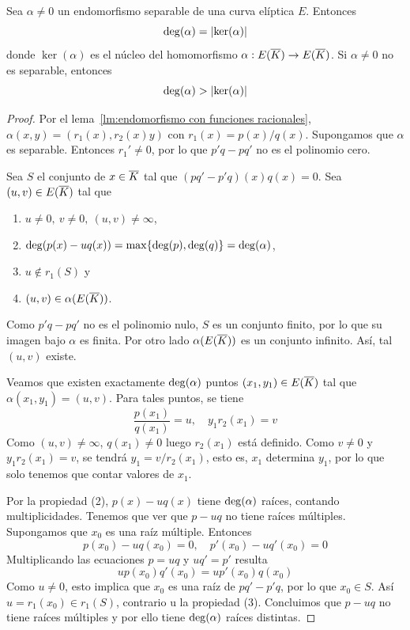 \begin{proposicion}\label{pp:cardinal del núcleo}
	Sea $\alpha \neq 0$ un endomorfismo separable de una curva elíptica $E$. Entonces
	$$
		\deg(\alpha) = \left\vert{\ker(\alpha)}\right\vert
	$$
	donde $\ker(\alpha)$ es el núcleo del homomorfismo $\alpha : E(\overline{K}) \to E(\overline{K})$. Si $\alpha \neq 0$ no es separable, entonces
	$$
		\deg(\alpha) > \left\vert{\ker(\alpha)}\right\vert
	$$
\end{proposicion}
\begin{proof}
	Por el lema~\ref{lm:endomorfismo con funciones racionales}, $\alpha(x, y) = (r_1(x), r_2(x) y)$ con $r_1(x) = p(x) / q(x)$. Supongamos que $\alpha$ es separable. Entonces $r_1' \neq 0$, por lo que $p' q - p q'$ no es el polinomio cero.

	Sea $S$ el conjunto de $x \in \overline{K}$ tal que $(p q' - p' q)(x) q(x) = 0$. Sea $(u, v) \in E(\overline{K})$ tal que
	\begin{enumerate}
		\item $u \neq 0,\ v \neq 0,\ (u, v) \neq \infty$,
		\item $\deg (p(x) - u q(x) ) = \max \{ \deg(p), \deg(q) \} = \deg(\alpha)$,
		\item $u \not\in r_1(S)$ y
		\item $(u, v) \in \alpha(E(\overline{K}))$.
	\end{enumerate}
	Como $p' q - p q'$ no es el polinomio nulo, $S$ es un conjunto finito, por lo que su imagen bajo $\alpha$ es finita. Por otro lado $\alpha(E(\overline{K}))$ es un conjunto infinito. Así, tal $(u, v)$ existe.

	Veamos que existen exactamente $\deg(\alpha)$ puntos $(x_1, y_1) \in E(\overline{K})$ tal que $\alpha(x_1, y_1) = (u, v)$. Para tales puntos, se tiene
	$$
	\frac{p(x_1)}{q(x_1)} = u, \quad y_1 r_2(x_1) = v
	$$
	Como $(u, v) \neq \infty$, $q(x_1) \neq 0$ luego $r_2(x_1)$ está definido. Como $v \neq 0$ y $y_1 r_2(x_1) = v$, se tendrá $y_1 = v/r_2(x_1)$, esto es, $x_1$ determina $y_1$, por lo que solo tenemos que contar valores de $x_1$.

	Por la propiedad (2), $p(x) - u q(x)$ tiene $\deg(\alpha)$ raíces, contando multiplicidades. Tenemos que ver que $p - u q$ no tiene raíces múltiples. Supongamos que $x_0$ es una raíz múltiple. Entonces
	$$
		p(x_0) - u q(x_0) = 0, \quad p'(x_0) - u q'(x_0) = 0
	$$
	Multiplicando las ecuaciones $p = u q$ y $u q' = p'$ resulta
	$$
		u p(x_0) q'(x_0) = u p'(x_0) q(x_0)
	$$
	Como $u \neq 0$, esto implica que $x_0$ es una raíz de $p q' - p' q$, por lo que $x_0 \in S$. Así $u = r_1(x_0) \in r_1(S)$, contrario u la propiedad (3). Concluimos que $p - u q$ no tiene raíces múltiples y por ello tiene $\deg(\alpha)$ raíces distintas.


\end{proof}
